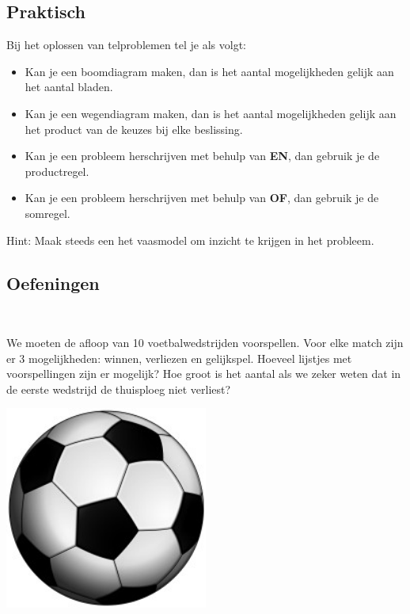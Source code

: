 \documentclass[12pt,a4paper,twoside]{article}
\begin{document}
\subsection{Praktisch}

\begin{mdframed}
Bij het oplossen van telproblemen tel je als volgt:
\begin{itemize}
  \item Kan je een boomdiagram maken, dan is het aantal mogelijkheden gelijk aan het aantal bladen.
  \item Kan je een wegendiagram maken, dan is het aantal mogelijkheden gelijk aan het product van de keuzes bij elke beslissing.
  \item Kan je een probleem herschrijven met behulp van {\bf EN}, dan gebruik je de productregel.
  \item Kan je een probleem herschrijven met behulp van {\bf OF}, dan gebruik je de somregel.
\end{itemize}
\end{mdframed}

Hint: Maak steeds een het vaasmodel om inzicht te krijgen in het probleem.

\needspace{4cm}
\subsection{Oefeningen}

\begin{oefening}\\
\begin{minipage}[]{0.7\textwidth}
We moeten de afloop van 10 voetbalwedstrijden voorspellen. Voor elke match zijn er 3 mogelijkheden: winnen, verliezen en gelijkspel. Hoeveel lijstjes met voorspellingen zijn er mogelijk? Hoe groot is het aantal als we zeker weten dat in de eerste wedstrijd de thuisploeg niet verliest?
\end{minipage}
\begin{minipage}[]{0.29\textwidth}
  \centering
  \includegraphics[width=0.5\textwidth]{voetbal}
\end{minipage}
\end{oefening}
\end{document}
